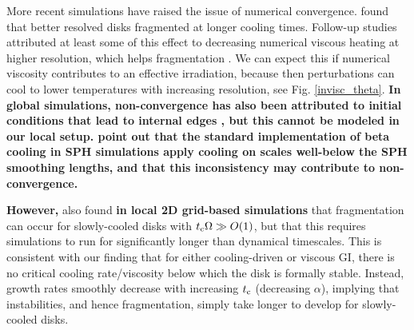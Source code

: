 



More recent simulations have raised the issue of numerical
convergence. %
\cite{meru11} found that better resolved disks fragmented at longer cooling times.
Follow-up studies attributed at least some of this effect to decreasing numerical viscous
heating at higher resolution, which helps fragmentation
\citep{lodato11,meru12}. 
We can expect this if numerical viscosity
contributes to an effective irradiation, %
because then perturbations can cool to lower temperatures with
increasing resolution, see Fig. \ref{invisc_theta}.  {\bf
  In global simulations, non-convergence has also been attributed to initial 
  conditions that lead to internal edges \citep{paardekooper11b}, but
  this cannot be modeled in our local setup. 
  \cite{rice12} point out that the standard implementation of beta cooling in
  SPH simulations apply cooling on scales well-below the SPH smoothing
  lengths, and that this inconsistency may contribute to
  non-convergence. 
}

{\bf However,} \cite{paardekooper12} also found {\bf in local 2D
  grid-based simulations} that fragmentation can occur  
for  slowly-cooled disks with $t_\mathrm{c}\Omega\gg O(1)$, but that this requires   
simulations to run for significantly longer than dynamical 
timescales. This is consistent with our finding
that for either cooling-driven or viscous GI, there is no critical 
cooling rate/viscosity below  which the disk is  
formally stable. Instead, growth rates smoothly decrease with
increasing $t_\mathrm{c}$ (decreasing $\alpha$), implying that
instabilities, and hence fragmentation, simply take longer to develop
for slowly-cooled disks.         

